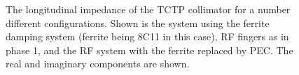 \begin{figure}
\begin{center}

\end{center}
\caption{The longitudinal impedance of the TCTP collimator for a number different configurations. Shown is the system using the ferrite damping system (ferrite being 8C11 in this case), RF fingers as in phase 1, and the RF system with the ferrite replaced by PEC. The real  and imaginary  components are shown.}
\label{fig:tctp-time-longitudinal}
\end{figure}


